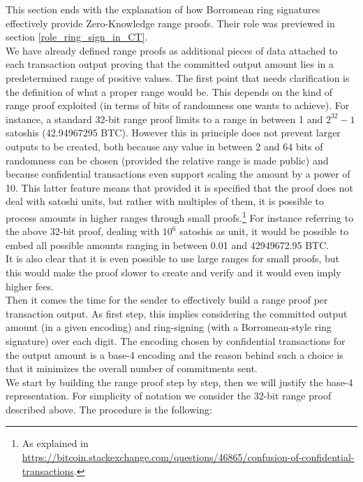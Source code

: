 \noindent
This section ends with the explanation of how Borromean ring signatures effectively provide Zero-Knowledge range proofs. Their role was previewed in section \ref{role_ring_sign_in_CT}.\\
We have already defined range proofs as additional pieces of data attached to each transaction output proving that the committed output amount lies in a predetermined range of positive values. The first point that needs clarification is the definition of what a proper range would be. This depends on the kind of range proof exploited (in terms of bits of randomness one wants to achieve). For instance, a standard 32-bit range proof limits to a range in between 1 and $2^{32}-1$ satoshis (42.94967295 BTC). However this in principle does not prevent larger outputs to be created, both because any value in between 2 and 64 bits of randomness can be chosen (provided the relative range is made public) and because confidential transactions even support scaling the amount by a power of 10. This latter feature means that provided it is specified that the proof does not deal with satoshi units, but rather with multiples of them, it is possible to process amounts in higher ranges through small proofs.\footnote{As explained in \url{https://bitcoin.stackexchange.com/questions/46865/confusion-of-confidential-transactions}.} For instance referring to the above 32-bit proof, dealing with $10^6$ satoshis as unit, it would be possible to embed all possible amounts ranging in between 0.01 and 42949672.95 BTC. \\
It is also clear that it is even possible to use large ranges for small proofs, but this would make the proof slower to create and verify and it would even imply higher fees.\\
Then it comes the time for the sender to effectively build a range proof per transaction output. As first step, this implies considering the committed output amount (in a given encoding) and ring-signing (with a Borromean-style ring signature) over each digit. The encoding chosen by confidential transactions for the output amount is a base-4 encoding and the reason behind such a choice is that it minimizes the overall number of commitments sent.\\
We start by building the range proof step by step, then we will justify the base-4 representation. For simplicity of notation we consider the 32-bit range proof described above. The procedure is the following:
